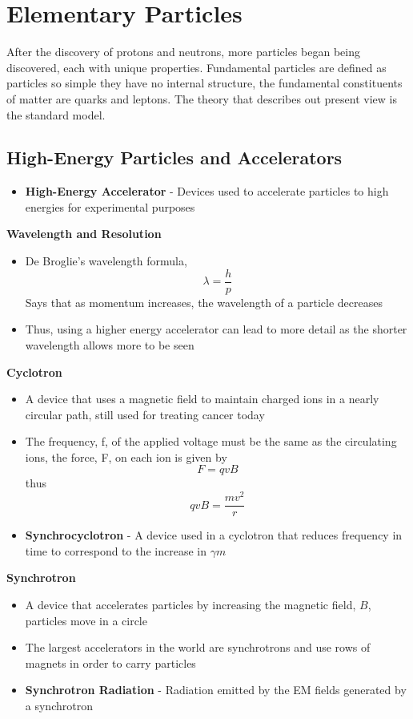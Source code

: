 \section{Elementary Particles}
After the discovery of protons and neutrons, more particles began being discovered, each with unique properties. Fundamental particles are defined as particles so simple they have no internal structure, the fundamental constituents of matter are quarks and leptons. The theory that describes out present view is the standard model.

\subsection{High-Energy Particles and Accelerators}
\begin{itemize}
    \item \textbf{High-Energy Accelerator} - Devices used to accelerate particles to high energies for experimental purposes
\end{itemize}

\textbf{Wavelength and Resolution}
\begin{itemize}
    \item De Broglie's wavelength formula, \[\lambda=\frac{h}{p}\] Says that as momentum increases, the wavelength of a particle decreases
    \item Thus, using a higher energy accelerator can lead to more detail as the shorter wavelength allows more to be seen
\end{itemize}

\textbf{Cyclotron}
\begin{itemize}
    \item A device that uses a magnetic field to maintain charged ions in a nearly circular path, still used for treating cancer today
    \item The frequency, f, of the applied voltage must be the same as the circulating ions, the force, F, on each ion is given by \[F=qvB\] thus \[qvB=\frac{mv^2}{r}\]
    \item \textbf{Synchrocyclotron} - A device used in a cyclotron that reduces frequency in time to correspond to the increase in \(\gamma m\)
\end{itemize}

\textbf{Synchrotron}
\begin{itemize}
    \item A device that accelerates particles by increasing the magnetic field, \(B\), particles move in a circle
    \item The largest accelerators in the world are synchrotrons and use rows of magnets in order to carry particles
    \item \textbf{Synchrotron Radiation} - Radiation emitted by the EM fields generated by a synchrotron 
\end{itemize}

